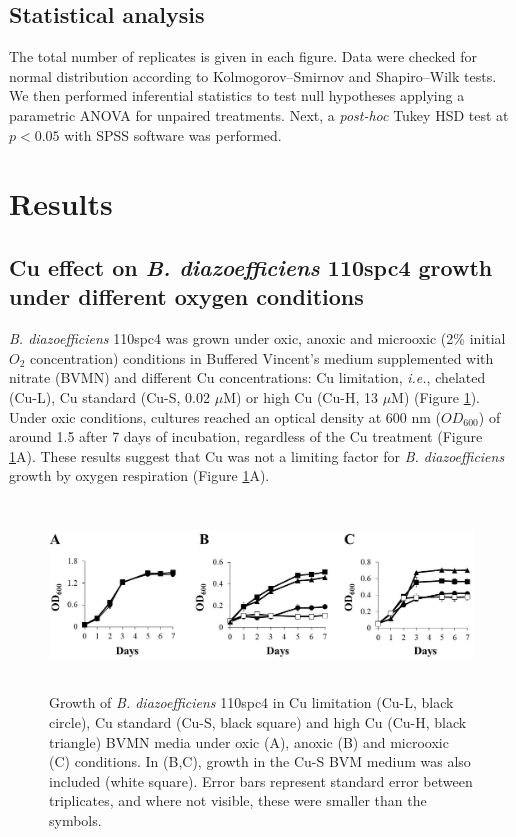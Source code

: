 \documentclass[a4paper,11pt]{article}
\begin{document}
\subsection{Statistical analysis}
The total number of replicates is given in each figure. Data were checked for normal
distribution according to Kolmogorov–Smirnov and Shapiro–Wilk tests. We then performed
inferential statistics to test null hypotheses applying a parametric ANOVA for unpaired
treatments. Next, a {\em post-hoc} Tukey HSD test at $p<0.05$ with SPSS software was performed.

\section{Results}
\subsection{Cu effect on {\em B. diazoefficiens} 110spc4 growth under different oxygen conditions}
{\em B. diazoefficiens} 110spc4 was grown under oxic, anoxic and microoxic (2\% initial $O_2$
concentration) conditions in Buffered Vincent’s medium \cite{serventi2012copper} supplemented with nitrate
(BVMN) and different Cu concentrations: Cu limitation, {\em i.e.}, chelated (Cu-L), Cu standard
(Cu-S, 0.02 $\mu$M) or high Cu (Cu-H, 13 $\mu$M) (Figure \ref{fig:figure1}). Under oxic conditions, cultures
reached an optical density at 600 nm ($OD_{600}$) of around 1.5 after 7 days of incubation,
regardless of the Cu treatment (Figure \ref{fig:figure1}A). These results suggest that Cu was not a limiting
factor for {\em B. diazoefficiens} growth by oxygen respiration (Figure \ref{fig:figure1}A). 
\begin{figure}[h!]
\centering
\includegraphics[height=5cm]{Images/Figure1.jpg}
\caption{Growth of {\em B. diazoefficiens} 110spc4 in Cu limitation (Cu-L, black circle), Cu standard (Cu-S, black square) and
high Cu (Cu-H, black triangle) BVMN media under oxic (A), anoxic (B) and microoxic (C) conditions. In (B,C),
growth in the Cu-S BVM medium was also included (white square). Error bars represent standard error between
triplicates, and where not visible, these were smaller than the symbols.}
\label{fig:figure1}
\end{figure}
\end{document}

